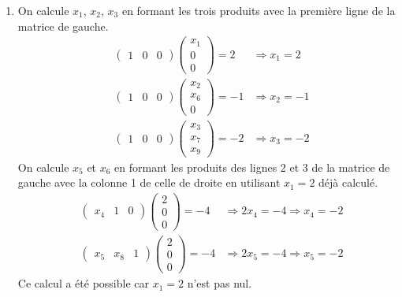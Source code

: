 \begin{enumerate}
  \item On calcule $x_1$, $x_2$, $x_3$ en formant les trois produits avec la première ligne de la matrice de gauche.
\begin{align*}
&\begin{pmatrix}
  1 & 0 & 0
\end{pmatrix} 
\begin{pmatrix}
  x_1 \\ 0 \\ 0
\end{pmatrix}
= 2 &\Rightarrow x_1 = 2 \\
&\begin{pmatrix}
  1 & 0 & 0
\end{pmatrix}
\begin{pmatrix}
  x_2 \\ x_6 \\ 0
\end{pmatrix}
= -1 &\Rightarrow x_2 = -1 \\
&\begin{pmatrix}
  1 & 0 & 0
\end{pmatrix}
\begin{pmatrix}
  x_3 \\ x_7 \\ x_9
\end{pmatrix}
= -2 &\Rightarrow x_3 = -2 
\end{align*}
On calcule $x_5$ et $x_6$ en formant les produits des lignes 2 et 3 de la matrice de gauche avec la colonne 1 de celle de droite en utilisant $x_1 = 2$ déjà calculé.
\begin{align*}
&\begin{pmatrix}
  x_4 & 1 & 0
\end{pmatrix}
\begin{pmatrix}
  2 \\ 0 \\ 0
\end{pmatrix}=-4 &\Rightarrow 2 x_4 = -4 \Rightarrow x_4 = -2 \\
&\begin{pmatrix}
  x_5 & x_8 & 1
\end{pmatrix}
\begin{pmatrix}
  2 \\ 0 \\ 0
\end{pmatrix}=-4 &\Rightarrow 2 x_5 = -4 \Rightarrow x_5 = -2  
\end{align*}
Ce calcul a été possible car $x_1=2$ n'est pas nul.\newline

\end{enumerate}
